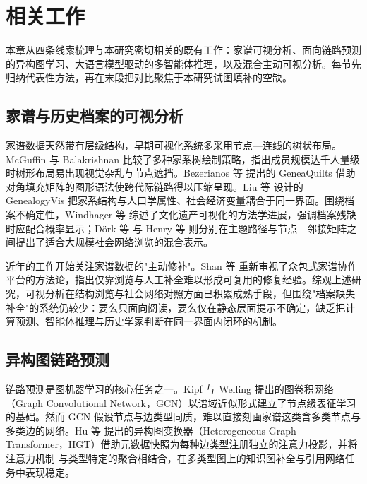 \chapter{相关工作}\label{chap:related}

本章从四条线索梳理与本研究密切相关的既有工作：家谱可视分析、面向链路预测的异构图学习、大语言模型驱动的多智能体推理，以及混合主动可视分析。每节先归纳代表性方法，再在末段把对比聚焦于本研究试图填补的空缺。

\section{家谱与历史档案的可视分析}\label{sec:related-vis-genealogy}

家谱数据天然带有层级结构，早期可视化系统多采用节点—连线的树状布局。McGuffin 与 Balakrishnan\citep{mcguffin2005genealogy} 比较了多种家系树绘制策略，指出成员规模达千人量级时树形布局易出现视觉杂乱与节点遮挡。Bezerianos 等\citep{bezerianos2010genealogy} 提出的 GeneaQuilts 借助对角填充矩阵的图形语法使跨代际链路得以压缩呈现。Liu 等\citep{liu2017genealogyvis} 设计的 GenealogyVis 把家系结构与人口学属性、社会经济变量耦合于同一界面。围绕档案不确定性，Windhager 等\citep{windhager2018vis} 综述了文化遗产可视化的方法学进展，强调档案残缺时应配合概率显示；Dörk 等\citep{dork2012pivotpaths} 与 Henry 等\citep{henry2006matrixexplorer} 则分别在主题路径与节点—邻接矩阵之间提出了适合大规模社会网络浏览的混合表示。

近年的工作开始关注家谱数据的"主动修补"。Shan 等\citep{shan2025reexamining} 重新审视了众包式家谱协作平台的方法论，指出仅靠浏览与人工补全难以形成可复用的修复经验。综观上述研究，可视分析在结构浏览与社会网络对照方面已积累成熟手段，但围绕"档案缺失补全"的系统仍较少：要么只面向阅读，要么仅在静态层面提示不确定，缺乏把计算预测、智能体推理与历史学家判断在同一界面内闭环的机制。

\section{异构图链路预测}\label{sec:related-graph}

链路预测是图机器学习的核心任务之一。Kipf 与 Welling\citep{kipf2016gcn} 提出的图卷积网络（Graph Convolutional Network，GCN）以谱域近似形式建立了节点级表征学习的基础。然而 GCN 假设节点与边类型同质，难以直接刻画家谱这类含多类节点与多类边的网络。Hu 等\citep{hu2020hgt} 提出的异构图变换器（Heterogeneous Graph Transformer，HGT）借助元数据快照为每种边类型注册独立的注意力投影，并将注意力机制\citep{vaswani2017attention} 与类型特定的聚合相结合，在多类型图上的知识图补全与引用网络任务中表现稳定。

